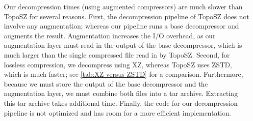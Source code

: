  Our decompression times (using augmented compressors) are much slower than TopoSZ for several reasons. First, the decompression pipeline of TopoSZ does not involve any augmentation;  whereas our pipeline runs a base decompressor and augments the result. Augmentation increases the I/O overhead, as our augmentation layer must read in the output of the base decompressor, which is much larger than the single compressed file read in by TopoSZ. Second, for lossless compression, we decompress using XZ, whereas TopoSZ uses ZSTD, which is much faster; see \cref{tab:XZ-versus-ZSTD} for a comparison. Furthermore, because we must store the output of the base decompressor and the augmentation layer, we must combine both files into a tar archive. Extracting this tar archive takes additional time. Finally, the code for our decompression pipeline is not optimized and has room for a more efficient implementation. 

